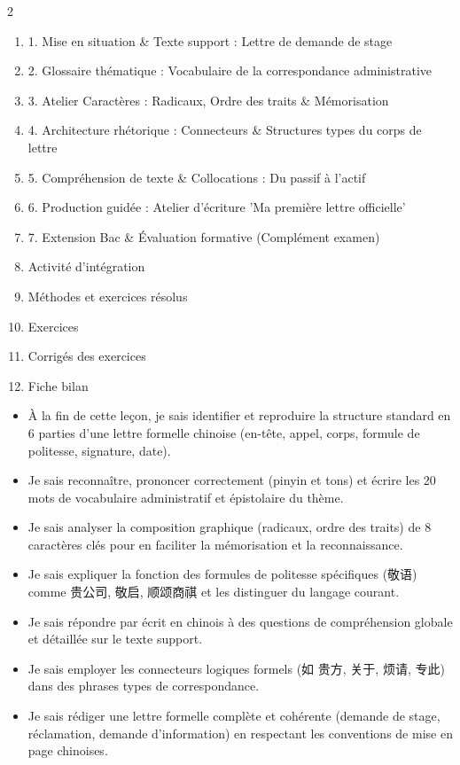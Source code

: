 \documentclass[11pt]{article}
\begin{document}
\begin{sommaire}
\begin{multicols}{2}
\begin{enumerate}
\item 1. Mise en situation \& Texte support : Lettre de demande de stage
\item 2. Glossaire thématique : Vocabulaire de la correspondance administrative
\item 3. Atelier Caractères : Radicaux, Ordre des traits \& Mémorisation
\item 4. Architecture rhétorique : Connecteurs \& Structures types du corps de lettre
\item 5. Compréhension de texte \& Collocations : Du passif à l'actif
\item 6. Production guidée : Atelier d'écriture 'Ma première lettre officielle'
\item 7. Extension Bac \& Évaluation formative (Complément examen)
\item Activité d'intégration
\item Méthodes et exercices résolus
\item Exercices
\item Corrigés des exercices
\item Fiche bilan
\end{enumerate}
\end{multicols}
\end{sommaire}

\begin{objectifs}
\begin{itemize}
\item À la fin de cette leçon, je sais identifier et reproduire la structure standard en 6 parties d'une lettre formelle chinoise (en-tête, appel, corps, formule de politesse, signature, date).
\item Je sais reconnaître, prononcer correctement (pinyin et tons) et écrire les 20 mots de vocabulaire administratif et épistolaire du thème.
\item Je sais analyser la composition graphique (radicaux, ordre des traits) de 8 caractères clés pour en faciliter la mémorisation et la reconnaissance.
\item Je sais expliquer la fonction des formules de politesse spécifiques (敬语) comme 贵公司, 敬启, 顺颂商祺 et les distinguer du langage courant.
\item Je sais répondre par écrit en chinois à des questions de compréhension globale et détaillée sur le texte support.
\item Je sais employer les connecteurs logiques formels (如 贵方, 关于, 烦请, 专此) dans des phrases types de correspondance.
\item Je sais rédiger une lettre formelle complète et cohérente (demande de stage, réclamation, demande d'information) en respectant les conventions de mise en page chinoises.
\end{itemize}
\end{objectifs}
\end{document}
